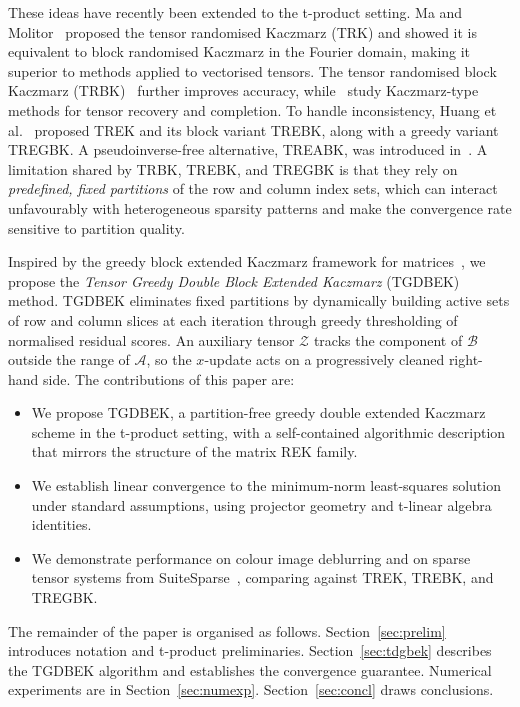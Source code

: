 \documentclass[11pt]{article}
\begin{document}
These ideas have recently been extended to the t-product setting. Ma and Molitor~\cite{molitor2022} proposed the tensor randomised Kaczmarz (TRK) and showed it is equivalent to block randomised Kaczmarz in the Fourier domain, making it superior to methods applied to vectorised tensors. The tensor randomised block Kaczmarz (TRBK)~\cite{ba02020TRB} further improves accuracy, while~\cite{chen2021, wang2022, wang2023, lia2024, zhang2024} study Kaczmarz-type methods for tensor recovery and completion. To handle inconsistency, Huang et al.~\cite{huang2023TREK} proposed TREK and its block variant TREBK, along with a greedy variant TREGBK. A pseudoinverse-free alternative, TREABK, was introduced in~\cite{lian2024TREABK}. A limitation shared by TRBK, TREBK, and TREGBK is that they rely on \emph{predefined, fixed partitions} of the row and column index sets, which can interact unfavourably with heterogeneous sparsity patterns and make the convergence rate sensitive to partition quality.

Inspired by the greedy block extended Kaczmarz framework for matrices~\cite{su2025}, we propose the \emph{Tensor Greedy Double Block Extended Kaczmarz} (TGDBEK) method. TGDBEK eliminates fixed partitions by dynamically building active sets of row and column slices at each iteration through greedy thresholding of normalised residual scores. An auxiliary tensor $\mathcal{Z}$ tracks the component of $\mathcal{B}$ outside the range of $\mathcal{A}$, so the $x$-update acts on a progressively cleaned right-hand side. The contributions of this paper are:
\begin{itemize}
    \item We propose TGDBEK, a partition-free greedy double extended Kaczmarz scheme in the t-product setting, with a self-contained algorithmic description that mirrors the structure of the matrix REK family.
    \item We establish linear convergence to the minimum-norm least-squares solution under standard assumptions, using projector geometry and t-linear algebra identities.
    \item We demonstrate performance on colour image deblurring and on sparse tensor systems from SuiteSparse~\cite{suiteSparse}, comparing against TREK, TREBK, and TREGBK.
\end{itemize}

The remainder of the paper is organised as follows. Section~\ref{sec:prelim} introduces notation and t-product preliminaries. Section~\ref{sec:tdgbek} describes the TGDBEK algorithm and establishes the convergence guarantee. Numerical experiments are in Section~\ref{sec:numexp}. Section~\ref{sec:concl} draws conclusions.
\end{document}
